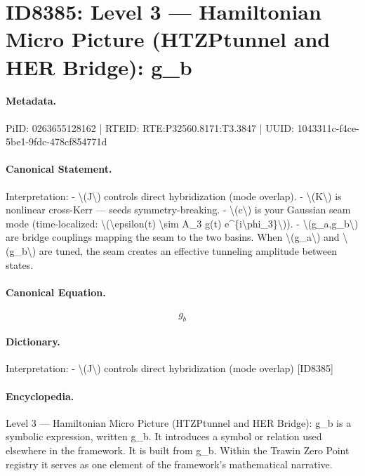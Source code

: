 \section*{ID8385: Level 3 — Hamiltonian Micro Picture (HTZPtunnel and HER Bridge): g\_b}
\paragraph{Metadata.}
PiID: 0263655128162 | RTEID: RTE:P32560.8171:T3.3847 | UUID: 1043311c-f4ce-5be1-9fdc-478cf854771d

\paragraph{Canonical Statement.}
Interpretation: - \textbackslash{}(J\textbackslash{}) controls direct hybridization (mode overlap). - \textbackslash{}(K\textbackslash{}) is nonlinear cross-Kerr — seeds symmetry-breaking. - \textbackslash{}(c\textbackslash{}) is your Gaussian seam mode (time-localized: \textbackslash{}(\textbackslash{}epsilon(t) \textbackslash{}sim A\_3 g(t) e\textasciicircum{}\{i\textbackslash{}phi\_3\}\textbackslash{})). - \textbackslash{}(g\_a,g\_b\textbackslash{}) are bridge couplings mapping the seam to the two basins. When \textbackslash{}(g\_a\textbackslash{}) and \textbackslash{}(g\_b\textbackslash{}) are tuned, the seam creates an effective tunneling amplitude between states.

\paragraph{Canonical Equation.}
\[
g_b
\]

\paragraph{Dictionary.}
Interpretation: - \textbackslash{}(J\textbackslash{}) controls direct hybridization (mode overlap) [ID8385]

\paragraph{Encyclopedia.}
Level 3 — Hamiltonian Micro Picture (HTZPtunnel and HER Bridge): g\_b is a symbolic expression, written g\_b. It introduces a symbol or relation used elsewhere in the framework. It is built from g\_b. Within the Trawin Zero Point registry it serves as one element of the framework's mathematical narrative.
